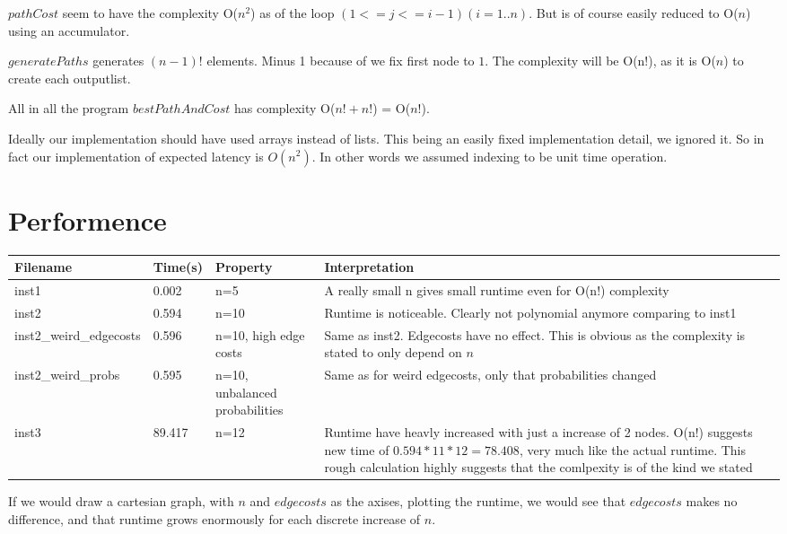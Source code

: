 \documentclass[a4paper,11pt]{article}
\begin{document}
$pathCost$ seem to have the complexity O($n^2$) as of the loop $(1 <= j <= i-1) (i = 1..n)$.
But is of course easily reduced to O($n$) using an accumulator.

$generatePaths$ generates $(n-1)!$ elements. Minus 1 because of we fix first node to $1$. 
The complexity will be O(n!), as it is O($n$) to create each outputlist.

All in all the program $bestPathAndCost$ has complexity O($n!+n!$) = O($n!$).

Ideally our implementation should have used arrays instead of lists.
This being an easily fixed implementation detail, we ignored it.
So in fact our implementation of expected latency is $O(n^2)$.
In other words we assumed indexing to be unit time operation. 

\section{Performence}

\begin{center}
    \begin{tabular}{ | l | l | p{4cm} | p{5cm} |}
    \hline
    Filename & Time(s) & Property & Interpretation \\ \hline
    inst1 & 0.002 & n=5 & A really small n gives small runtime even for O(n!) complexity\\ \hline
    inst2 & 0.594 & n=10 & Runtime is noticeable. Clearly not polynomial anymore comparing to inst1 \\ \hline
    inst2\_weird\_edgecosts & 0.596 & n=10, high edge costs & Same as inst2. Edgecosts have no effect.
        This is obvious as the complexity is stated to only depend on $n$ \\ \hline
    inst2\_weird\_probs & 0.595 & n=10, unbalanced probabilities & Same as for weird edgecosts, only that probabilities changed \\ \hline
    inst3 & 89.417 & n=12 & Runtime have heavly increased with just a increase of 2 nodes.
        O(n!) suggests new time of $0.594*11*12=78.408$, very much like the actual runtime. 
        This rough calculation highly suggests that the comlpexity is of the kind we stated \\ \hline
    \end{tabular}
\end{center}

If we would draw a cartesian graph, with $n$ and $edgecosts$ as the axises, plotting the runtime,
we would see that $edgecosts$ makes no difference, and that runtime grows enormously for each
discrete increase of $n$.
\end{document}
